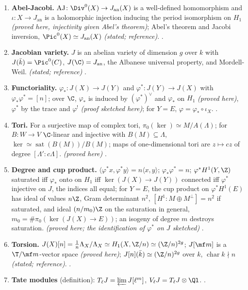 \begin{enumerate}[label=\textbf{\thechapter.\arabic*}]
\item \textbf{Abel-Jacobi.} $\operatorname{AJ}\colon\Div^0(X)\to J_{\mathrm{an}}(X)$ is a well-defined homomorphism and $\iota\colon X\to J_{\mathrm{an}}$ is a holomorphic injection inducing the period isomorphism on
$H_1$ \emph{(proved here, injectivity given Abel's theorem)}; Abel's theorem and Jacobi inversion, $\Pic^0(X)\simeq J_{\mathrm{an}}(X)$ \emph{(stated; reference)}. .
\item \textbf{Jacobian variety.} $J$ is an abelian variety of dimension $g$ over $k$ with $J(\bar k)=\Pic^0(C)$, $J(\C)=J_{\mathrm{an}}$, the Albanese universal property, and Mordell-Weil.
\emph{(stated; reference)} .
\item \textbf{Functoriality.} $\varphi_*\colon J(X)\to J(Y)$ and $\varphi^*\colon J(Y)\to J(X)$ with $\varphi_*\varphi^*=[n]$; over $\C$, $\varphi_*$ is induced by $(\varphi^*)^\vee$ and $\varphi_*$ on $H_1$
\emph{(proved here)}, $\varphi^*$ by the trace and $\varphi^!$ \emph{(proof sketched here)}; for $Y=E$, $\varphi=\varphi_*\circ\iota_X$. .
\item \textbf{Tori.} For a surjective map of complex tori, $\pi_0(\ker)\simeq M/A(\Lambda)$; for $B\colon W\to V$ $\C$-linear and injective with $B(M)\subseteq\Lambda$, $\ker\simeq\operatorname{sat}(B(M))/B(M)$; maps of one-dimensional tori are $z\mapsto cz$ of
degree $[\Lambda':c\Lambda]$. \emph{(proved here)} .
\item \textbf{Degree and cup product.} $\langle\varphi^*x,\varphi^*y\rangle=n\langle x,y\rangle$; $\varphi_*\varphi^*=n$; $\varphi^*H^1(Y,\Z)$ saturated iff $\varphi_*$ onto on $H_1$ iff $\ker(J(X)\to J(Y))$
connected iff $\varphi^*$ injective on $J$, the indices all equal; for $Y=E$, the cup product on $\varphi^*H^1(E)$ has ideal of values $n\Z$, Gram determinant $n^2$, $[H^1:M\oplus M^\perp]=n^2$ if
saturated, and ideal $(n/m_0)\Z$ on the saturation in general, $m_0=\#\pi_0(\ker(J(X)\to E))$; an isogeny of degree $m$ destroys saturation. \emph{(proved here; the identification of $\varphi^*$ on $J$ sketched)}
.
\item \textbf{Torsion.} $J(X)[n]=\frac1n\Lambda_X/\Lambda_X\simeq H_1(X,\Z/n)\simeq(\Z/n)^{2g}$; $J[\mf m]$ is a $\T/\mf m$-vector space \emph{(proved here)}; $J[n](\bar k)\simeq(\Z/n)^{2g}$ over $k$,
$\operatorname{char}k\nmid n$ \emph{(stated; reference)}. .
\item \textbf{Tate modules} (definition): $T_\ell J=\varprojlim J[\ell^m]$, $V_\ell J=T_\ell J\otimes\Ql$. .

\end{enumerate}
